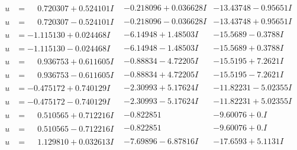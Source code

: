 \documentclass[1p]{elsarticle_modified}
\theoremstyle{definition}
\begin{document}
$$\begin{array}{c|c|c}
\begin{aligned}
u &= \phantom{-}0.720307 + 0.524101 I\end{aligned}
 & -0.218096 + 0.036628 I & -13.43748 - 0.95651 I \\ \hline\begin{aligned}
u &= \phantom{-}0.720307 - 0.524101 I\end{aligned}
 & -0.218096 - 0.036628 I & -13.43748 + 0.95651 I \\ \hline\begin{aligned}
u &= -1.115130 + 0.024468 I\end{aligned}
 & -6.14948 + 1.48503 I & -15.5689 - 0.3788 I \\ \hline\begin{aligned}
u &= -1.115130 - 0.024468 I\end{aligned}
 & -6.14948 - 1.48503 I & -15.5689 + 0.3788 I \\ \hline\begin{aligned}
u &= \phantom{-}0.936753 + 0.611605 I\end{aligned}
 & -0.88834 - 4.72205 I & -15.5195 + 7.2621 I \\ \hline\begin{aligned}
u &= \phantom{-}0.936753 - 0.611605 I\end{aligned}
 & -0.88834 + 4.72205 I & -15.5195 - 7.2621 I \\ \hline\begin{aligned}
u &= -0.475172 + 0.740129 I\end{aligned}
 & -2.30993 + 5.17624 I & -11.82231 - 5.02355 I \\ \hline\begin{aligned}
u &= -0.475172 - 0.740129 I\end{aligned}
 & -2.30993 - 5.17624 I & -11.82231 + 5.02355 I \\ \hline\begin{aligned}
u &= \phantom{-}0.510565 + 0.712216 I\end{aligned}
 & -0.822851\phantom{ +0.000000I} & -9.60076 + 0. I\phantom{ +0.000000I} \\ \hline\begin{aligned}
u &= \phantom{-}0.510565 - 0.712216 I\end{aligned}
 & -0.822851\phantom{ +0.000000I} & -9.60076 + 0. I\phantom{ +0.000000I} \\ \hline\begin{aligned}
u &= \phantom{-}1.129810 + 0.032613 I\end{aligned}
 & -7.69896 - 6.87816 I & -17.6593 + 5.1131 I \\ \hline\begin{aligned}

\end{aligned}
\end{array}$$
\end{document}
